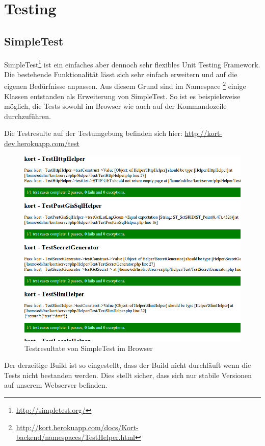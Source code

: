 \section{Testing}

\subsection{SimpleTest}
SimpleTest\footnote{\url{http://simpletest.org/}} ist ein einfaches aber dennoch sehr flexibles Unit Testing Framework.
Die bestehende Funktionalität lässt sich sehr einfach erweitern und auf die eigenen Bedürfnisse anpassen.
Aus diesem Grund sind im Namespace \footnote{\url{http://kort.herokuapp.com/docs/Kort-backend/namespaces/TestHelper.html}} einige Klassen entstanden als Erweiterung von SimpleTest.
So ist es beispielsweise möglich, die Tests sowohl im Browser wie auch auf der Kommandozeile durchzuführen.

Die Testresulte auf der Testumgebung befinden sich hier: \url{http://kort-dev.herokuapp.com/test}

\begin{figure}[H]
	\centering
	\includegraphics[width=\textwidth]{images/implementation/backend/simple-test}
	\caption{Testresultate von SimpleTest im Browser}
	\label{image-simple-test}
\end{figure}

Der derzeitige Build ist so eingestellt, dass der Build nicht durchläuft wenn die Tests nicht bestanden werden.
Dies stellt sicher, dass sich nur stabile Versionen auf unserem Webserver befinden.

